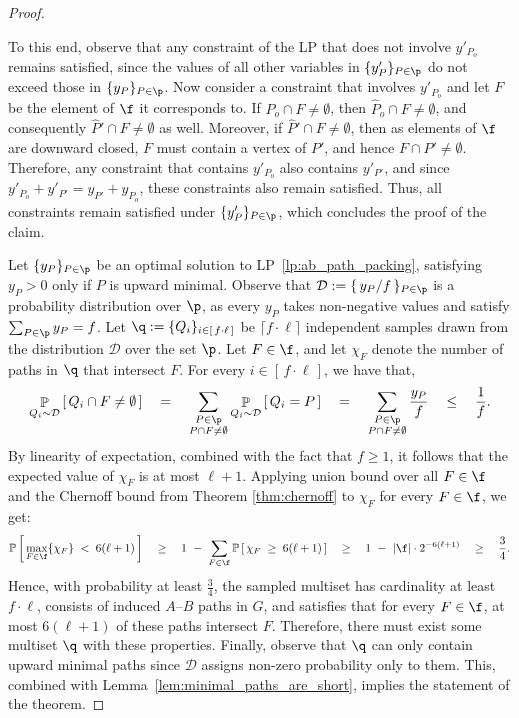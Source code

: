 \begin{proof}
\begin{claimproof}
        To this end, observe that any constraint of the LP that does not involve $y'_{P_o}$ remains satisfied, since the values of all other variables in $\{y'_P\}_{P \in \p}$ do not exceed those in $\{y_P\}_{P \in \p}$. Now consider a constraint that involves $y'_{P_o}$ and let $F$ be the element of $\f$ it corresponds to. If $P_o \cap F \neq \emptyset$, then $\widehat{P}_o \cap F \neq \emptyset$, and consequently $\widehat{P}' \cap F \neq \emptyset$ as well. Moreover, if $\widehat{P}' \cap F \neq \emptyset$, then as elements of $\f$ are downward closed, $F$ must contain a vertex of $P'$, and hence $F \cap P' \neq \emptyset$. Therefore, any constraint that contains $y'_{P_o}$ also contains $y'_{P'}$, and since $y'_{P_o} + y'_{P'} = y_{P'} + y_{P_o}$, these constraints also remain satisfied. Thus, all constraints remain satisfied under $\{y'_P\}_{P \in \p}$, which concludes the proof of the claim.
    \end{claimproof}
    
    Let $\{y_P\}_{P\in\p}$ be an optimal solution to LP~\ref{lp:ab_path_packing}, satisfying $y_P > 0$ only if $P$ is upward minimal. Observe that $\mathcal{D} := \{\,y_P/f\,\}_{P\in\p}$ is a probability distribution over $\p$, as every $y_P$ takes non-negative values and satisfy $\sum_{P\in\p}y_P = f$. Let $\q := \{Q_i\}_{i\in[\,f \cdot \ell\,]}$ be $\lceil f \cdot \ell\rceil$ independent samples drawn from the distribution $\mathcal{D}$ over the set $\p$. Let $F \in \f$, and let $\chi_F$ denote the number of paths in $\q$ that intersect $F$. For every $i\in[\,f \cdot \ell\,]$, we have that,
    $$
    \displaystyle \mathop{\mathbb{P}}\limits_{\substack{Q_i\sim\mathcal{D}}}\left[\,Q_i \cap F \neq \emptyset\,\right] \quad
    = \quad \sum_{\substack{P\in\p\\ P\cap F\neq \emptyset}}
    \displaystyle \mathop{\mathbb{P}}\limits_{\substack{Q_i\sim\mathcal{D}}}\left[\, Q_i = P\, \right] \quad
    = \quad \sum_{\substack{P\in\p\\ P\cap F\neq \emptyset}} \frac{y_{P}}{f} \quad
    \leq \quad \frac{1}{f}.
    $$
    By linearity of expectation, combined with the fact that $f \geq 1$, it follows that the expected value of $\chi_F$ is at most $\ell + 1$. Applying union bound over all $F\in\f$ and the Chernoff bound from Theorem \ref{thm:chernoff} to $\chi_F$ for every $F\in\f$, we get:
    $$
    \mathbb{P}\left[\,\max_{F\in\f}\{\chi_F\}\; <\; 6 (\ell+1)\,\right] \quad
    \geq \quad 1\ -\ \sum_{F\in\f}\mathbb{P}\left[\,\chi_F\; \geq\; 6 (\ell+1)\,\right] \quad
    \geq \quad 1\ -\ |\f| \cdot 2^{-6 (\ell+1)} \quad
    \geq \quad \frac{3}{4}.
    $$
    Hence, with probability at least $\frac{3}{4}$, the sampled multiset has cardinality at least $f \cdot \ell$, consists of induced $A$--$B$ paths in $G$, and satisfies that for every $F \in \f$, at most $6(\ell+1)$ of these paths intersect $F$. Therefore, there must exist some multiset $\q$ with these properties. Finally, observe that $\q$ can only contain upward minimal paths since $\mathcal{D}$ assigns non-zero probability only to them. This, combined with Lemma~\ref{lem:minimal_paths_are_short}, implies the statement of the theorem.
\end{proof}

